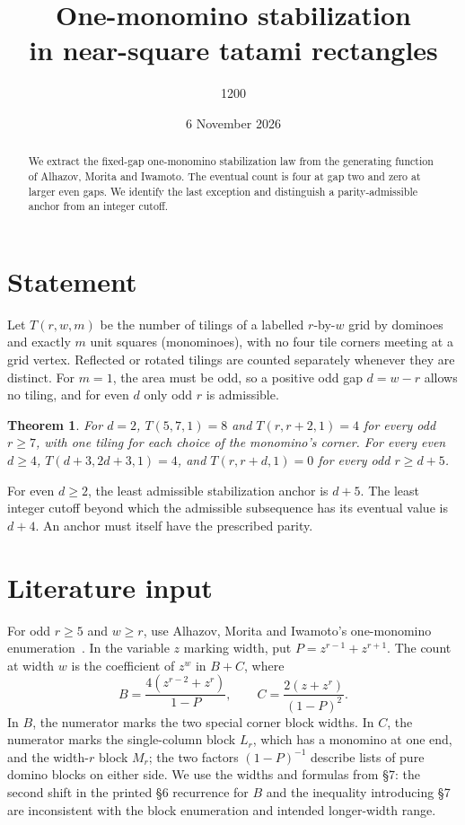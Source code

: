 \documentclass[11pt]{article}
\title{\textbf{One-monomino stabilization\\in near-square tatami rectangles}}
\author{1200}
\date{6 November 2026}
\newtheorem{theorem}{Theorem}
\begin{document}
\maketitle
\begin{abstract}
We extract the fixed-gap one-monomino stabilization law from the
generating function of Alhazov, Morita and Iwamoto. The eventual count is
four at gap two and zero at larger even gaps. We identify the last exception
and distinguish a parity-admissible anchor from an integer cutoff.
\end{abstract}

\section{Statement}
Let $T(r,w,m)$ be the number of tilings of a labelled $r$-by-$w$ grid by
dominoes and exactly $m$ unit squares (monominoes), with no four tile corners
meeting at a grid vertex. Reflected or rotated tilings are counted separately
whenever they are distinct. For $m=1$, the area must be odd, so a positive
odd gap $d=w-r$ allows no tiling, and for even $d$ only odd $r$ is admissible.

\begin{theorem}
For $d=2$, $T(5,7,1)=8$ and $T(r,r+2,1)=4$ for every odd $r\geq7$,
with one tiling for each choice of the monomino's corner.
For every even $d\geq4$, $T(d+3,2d+3,1)=4$, and $T(r,r+d,1)=0$
for every odd $r\geq d+5$.
\end{theorem}

For even $d\geq2$, the least admissible stabilization anchor is $d+5$.
The least integer cutoff beyond which the admissible subsequence has
its eventual value is $d+4$. An anchor must itself have the prescribed parity.

\section{Literature input}
For odd $r\geq5$ and $w\geq r$, use Alhazov, Morita and Iwamoto's
one-monomino enumeration~\cite[\S\S3, 5 and 7]{ami}. In the variable $z$
marking width, put $P=z^{r-1}+z^{r+1}$. The count at width $w$ is the
coefficient of $z^w$ in $B+C$, where
\[
 B=\frac{4(z^{r-2}+z^r)}{1-P},
 \qquad C=\frac{2(z+z^r)}{(1-P)^2}.
\]
In $B$, the numerator marks the two special corner block widths. In $C$,
the numerator marks the single-column block $L_r$, which has a monomino at
one end, and the width-$r$ block $M_r$; the two factors $(1-P)^{-1}$ describe
lists of pure domino blocks on either side. We use the widths and formulas
from \S7: the second shift in the printed \S6 recurrence for $B$ and the
inequality introducing \S7 are inconsistent with the block enumeration
and intended longer-width range.
\end{document}
